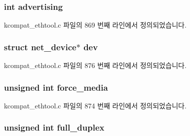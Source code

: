 \subsubsection[{\texorpdfstring{advertising}{advertising}}]{\setlength{\rightskip}{0pt plus 5cm}int advertising}\hypertarget{struct__kc__mii__if__info_a325f793290a1bcf9f48639146ef529f6}{}\label{struct__kc__mii__if__info_a325f793290a1bcf9f48639146ef529f6}


kcompat\+\_\+ethtool.\+c 파일의 869 번째 라인에서 정의되었습니다.

\subsubsection[{\texorpdfstring{dev}{dev}}]{\setlength{\rightskip}{0pt plus 5cm}struct net\+\_\+device$\ast$ dev}\hypertarget{struct__kc__mii__if__info_abf690dbcccc005ba94a1ce16864ccdc9}{}\label{struct__kc__mii__if__info_abf690dbcccc005ba94a1ce16864ccdc9}


kcompat\+\_\+ethtool.\+c 파일의 876 번째 라인에서 정의되었습니다.

\subsubsection[{\texorpdfstring{force\+\_\+media}{force_media}}]{\setlength{\rightskip}{0pt plus 5cm}unsigned int force\+\_\+media}\hypertarget{struct__kc__mii__if__info_a8b35d1c3e6ba76ee47536214bf78eed0}{}\label{struct__kc__mii__if__info_a8b35d1c3e6ba76ee47536214bf78eed0}


kcompat\+\_\+ethtool.\+c 파일의 874 번째 라인에서 정의되었습니다.

\subsubsection[{\texorpdfstring{full\+\_\+duplex}{full_duplex}}]{\setlength{\rightskip}{0pt plus 5cm}unsigned int full\+\_\+duplex}\hypertarget{struct__kc__mii__if__info_a6c5ff5f0d7818e5e008086f4e0611b34}{}\label{struct__kc__mii__if__info_a6c5ff5f0d7818e5e008086f4e0611b34}


